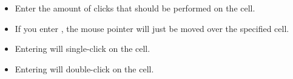 % 
\begin{itemize}
\item Enter the amount of clicks that should be performed on the cell.
\item If you enter , the mouse pointer will just be moved over the specified cell.
\item Entering  will single-click on the cell.
\item Entering  will double-click on the cell. 
\end{itemize}
